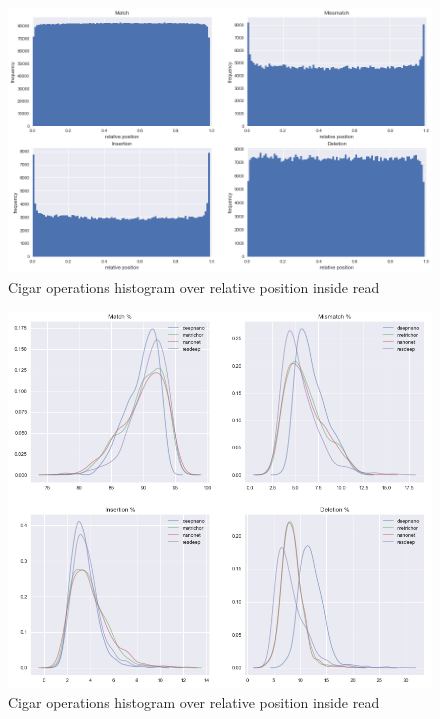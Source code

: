 \documentclass[times, utf8, diplomski, numeric, english]{fer}
\begin{document}
\begin{figure}[!ht]
	\begin{center}
		\includegraphics[width=1\textwidth]{./imgs/operation_distributed_r9.png}
		\caption{Cigar operations histogram over relative position inside read}
		\label{fg:cigar_op_dist}
	\end{center}
\end{figure}



\begin{figure}[!ht]
	\begin{center}
		\includegraphics[width=1\textwidth]{./imgs/results/ecoli/kde_cigar.png}
		\caption{Cigar operations histogram over relative position inside read}
		\label{fg:ecoli_kde}
	\end{center}
\end{figure}
\end{document}
